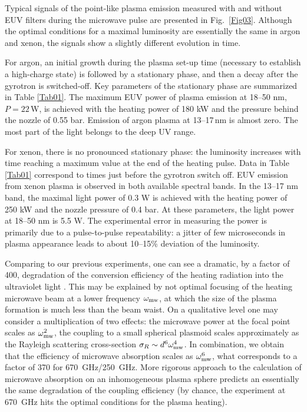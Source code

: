 \documentclass[aip, apl, amsmath,amssymb, reprint]{revtex4-1}
\begin{document}
Typical signals of the point-like plasma emission measured with and without EUV filters during the microwave pulse are presented in Fig.~\ref{Fig03}. Although the optimal conditions for a maximal luminosity are essentially the same in argon and xenon, the signals show a slightly different evolution in time.

For argon, an initial growth during the plasma set-up time (necessary to establish a high-charge state) is followed by a stationary phase, and then a decay after the gyrotron is switched-off. Key parameters of the stationary phase are summarized in Table \ref{Tab01}. The maximum EUV power of plasma emission at 18--50 nm, $P= 22\,$W, is achieved with the heating power of 180 kW and the pressure behind the nozzle of 0.55 bar. Emission of argon plasma at 13--17\,nm is almost zero. The most part of the light belongs to the deep UV range. 

For xenon, there is no pronounced stationary phase: the luminosity increases with time reaching a maximum value at the end of the heating pulse. Data in Table \ref{Tab01} correspond to times just before the gyrotron switch off. EUV emission from xenon plasma is observed in both available spectral bands. In the 13--17 nm band, the maximal light power of 0.3 W is achieved with the heating power of 250 kW and the nozzle pressure of 0.4 bar. At these parameters, the light power at 18--50 nm is 5.5 W. The experimental error in measuring the power is primarily due to a pulse-to-pulse repeatability: a jitter of few microseconds in plasma appearance leads to about 10--15\% deviation of the luminosity.


Comparing to our previous experiments\cite{glyavin_apl_2014}, one can see a dramatic, by a factor of 400, degradation of the conversion efficiency of the heating radiation into the ultraviolet light \cite{fn}. 
This may be explained by not optimal focusing of the heating microwave beam at a lower frequency $\omega_{\rm{mw}}$, at which the size of the plasma formation is much less than the beam waist. 
On a qualitative level one may consider a multiplication of two effects: the microwave power at the focal point scales as $\omega_{\rm{mw}}^2$, the coupling to a small spherical plasmoid scales approximately as the Rayleigh scattering cross-section $\sigma_R\sim d^6\omega_{\rm{mw}}^4$. In combination, we obtain that the efficiency of microwave absorption scales as $\omega_{\rm{mw}}^6$, what corresponds to a factor of 370 for 670~GHz/250~GHz. More rigorous approach to the calculation of microwave absorption on an inhomogeneous plasma sphere \cite{IEEE} predicts an essentially the same degradation of the coupling efficiency %
(by chance, the experiment at 670~GHz hits the optimal conditions for the plasma heating). 
\end{document}
